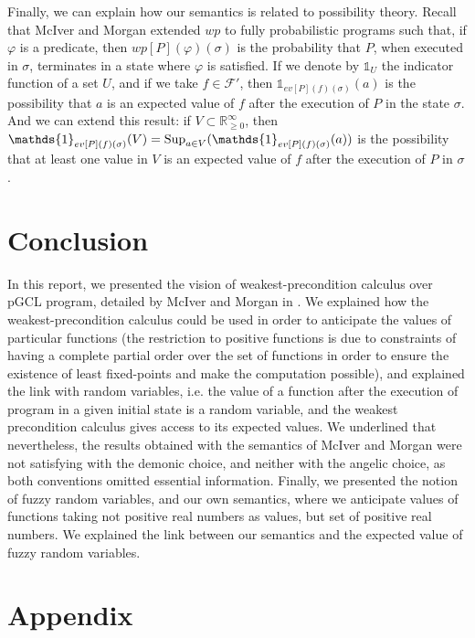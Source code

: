 \documentclass[a4paper,10pt]{llncs}
\def\RRposi {{\mathbb R_{\geq 0}^{\infty}}}
\def\Sup {\textnormal {Sup}}
\begin{document}
Finally, we can explain how our semantics is related to possibility theory. Recall that McIver and Morgan extended $wp$ to fully probabilistic programs such that, if $\varphi$ is a predicate, then $wp[P](\varphi)(\sigma)$ is the probability that $P$, when executed in $\sigma$, terminates in a state where $\varphi$ is satisfied.\newline
If we denote by $\mathds{1}_U$ the indicator function of a set $U$, and if we take $f \in \mathcal{F}'$, then $\mathds{1}_{ev[P](f)(\sigma)}(a)$ is the possibility that $a$ is an expected value of $f$ after the execution of $P$ in the state $\sigma$. And we can extend this result: if $V \subset \RRposi$, then $\mathds{1}_{ev[P](f)(\sigma)}(V) = \Sup_{a \in V}(\mathds{1}_{ev[P](f)(\sigma)}(a))$ is the possibility that at least one value in $V$ is an expected value of $f$ after the execution of $P$ in $\sigma$.

\section{Conclusion}
\label{sec:conclusion}
In this report, we presented the vision of weakest-precondition calculus over pGCL program, detailed by McIver and Morgan in \cite{McIver05}. We explained how the weakest-precondition calculus could be used in order to anticipate the values of particular functions (the restriction to positive functions is due to constraints of having a complete partial order over the set of functions in order to ensure the existence of least fixed-points and make the computation possible), and explained the link with random variables, i.e. the value of a function after the execution of program in a given initial state is a random variable, and the weakest precondition calculus gives access to its expected values. We underlined that nevertheless, the results obtained with the semantics of McIver and Morgan were not satisfying with the demonic choice, and neither with the angelic choice, as both conventions omitted essential information. Finally, we presented the notion of fuzzy random variables, and our own semantics, where we anticipate values of functions taking not positive real numbers as values, but set of positive real numbers. We explained the link between our semantics and the expected value of fuzzy random variables.


{}


\newpage
\section{Appendix}
\label{sec:appendix}
\end{document}

